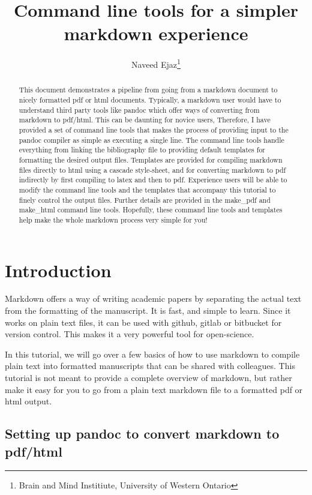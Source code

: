 \documentclass[letterpaper,11pt,twoside,onecolumn,notitlepage]{article}
\title{Command line tools for a simpler markdown experience}
\author{Naveed Ejaz\thanks{Brain and Mind Institiute, University of Western Ontario}}
\begin{document}
	\maketitle


	\hrulefill
	\begin{abstract}
		This document demonstrates a pipeline from going from a markdown
document to nicely formatted pdf or html documents. Typically, a
markdown user would have to understand third party tools like pandoc
which offer ways of converting from markdown to pdf/html. This can be
daunting for novice users, Therefore, I have provided a set of command
line tools that makes the process of providing input to the pandoc
compiler as simple as executing a single line. The command line tools
handle everything from linking the bibliography file to providing
default templates for formatting the desired output files. Templates are
provided for compiling markdown files directly to html using a cascade
style-sheet, and for converting markdown to pdf indirectly by first
compiling to latex and then to pdf. Experience users will be able to
modify the command line tools and the templates that accompany this
tutorial to finely control the output files. Further details are
provided in the make\_pdf and make\_html command line tools. Hopefully,
these command line tools and templates help make the whole markdown
process very simple for you!
	\end{abstract}
	\hrulefill

\linenumbers
	\hypertarget{introduction}{%
\section{Introduction}\label{introduction}}

Markdown offers a way of writing academic papers by separating the
actual text from the formatting of the manuscript. It is fast, and
simple to learn. Since it works on plain text files, it can be used with
github, gitlab or bitbucket for version control. This makes it a very
powerful tool for open-science.

In this tutorial, we will go over a few basics of how to use markdown to
compile plain text into formatted manuscripts that can be shared with
colleagues. This tutorial is not meant to provide a complete overview of
markdown, but rather make it easy for you to go from a plain text
markdown file to a formatted pdf or html output.

\hypertarget{setting-up-pandoc-to-convert-markdown-to-pdfhtml}{%
\subsection{Setting up pandoc to convert markdown to
pdf/html}\label{setting-up-pandoc-to-convert-markdown-to-pdfhtml}}
\end{document}
